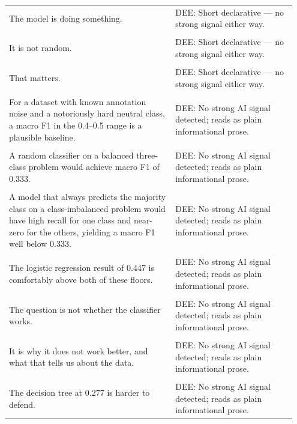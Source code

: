 \documentclass[11pt]{article}
\begin{document}
\begin{longtable}{|p{0.55\linewidth}|p{0.40\linewidth}|}
\hline
\rule{0pt}{3.5cm} & \\
\hline
The model is doing something. & DEE: Short declarative --- no strong signal either way. \\[2pt]
\hline
\rule{0pt}{3.5cm} & \\
\hline
It is not random. & DEE: Short declarative --- no strong signal either way. \\[2pt]
\hline
\rule{0pt}{3.5cm} & \\
\hline
That matters. & DEE: Short declarative --- no strong signal either way. \\[2pt]
\hline
\rule{0pt}{3.5cm} & \\
\hline
For a dataset with known annotation noise and a notoriously hard neutral class, a macro F1 in the 0.4--0.5 range is a plausible baseline. & DEE: No strong AI signal detected; reads as plain informational prose. \\[2pt]
\hline
\rule{0pt}{3.5cm} & \\
\hline
A random classifier on a balanced three-class problem would achieve macro F1 of 0.333. & DEE: No strong AI signal detected; reads as plain informational prose. \\[2pt]
\hline
\rule{0pt}{3.5cm} & \\
\hline
A model that always predicts the majority class on a class-imbalanced problem would have high recall for one class and near-zero for the others, yielding a macro F1 well below 0.333. & DEE: No strong AI signal detected; reads as plain informational prose. \\[2pt]
\hline
\rule{0pt}{3.5cm} & \\
\hline
The logistic regression result of 0.447 is comfortably above both of these floors. & DEE: No strong AI signal detected; reads as plain informational prose. \\[2pt]
\hline
\rule{0pt}{3.5cm} & \\
\hline
The question is not whether the classifier works. & DEE: No strong AI signal detected; reads as plain informational prose. \\[2pt]
\hline
\rule{0pt}{3.5cm} & \\
\hline
It is why it does not work better, and what that tells us about the data. & DEE: No strong AI signal detected; reads as plain informational prose. \\[2pt]
\hline
\rule{0pt}{3.5cm} & \\
\hline
The decision tree at 0.277 is harder to defend. & DEE: No strong AI signal detected; reads as plain informational prose. \\[2pt]

\end{longtable}
\end{document}
